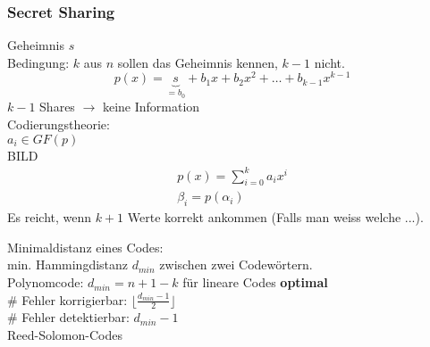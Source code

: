 \subsubsection{Secret Sharing}
Geheimnis $s$ \\
Bedingung: $k$ aus $n$ sollen das Geheimnis kennen, $k-1$ nicht.
 \[ p(x) = \underbrace{s}_{=b_0} + b_1 x + b_2 x^2 + \dots + b_{k-1} x^{k-1} \]
 $k-1$ Shares $\rightarrow$ keine Information \\
 
 Codierungstheorie: \\
 $a_i \in GF(p)$ \\
 BILD \\
 \begin{gather*}
 	p(x) = \sum_{i=0}^k a_i x^i \\
 	\beta_i = p(\alpha_i)
\end{gather*}
Es reicht, wenn $k+1$ Werte korrekt ankommen (Falls man weiss welche ...).

Minimaldistanz eines Codes: \\
min. Hammingdistanz $d_{min}$ zwischen zwei Codewörtern. \\
Polynomcode: $d_{min} = n + 1 - k$ für lineare Codes \textbf{optimal} \\
\# Fehler korrigierbar: $\lfloor \frac{d_{min} - 1}{2} \rfloor$ \\
\# Fehler detektierbar: $d_{min} - 1$ \\
Reed-Solomon-Codes
	